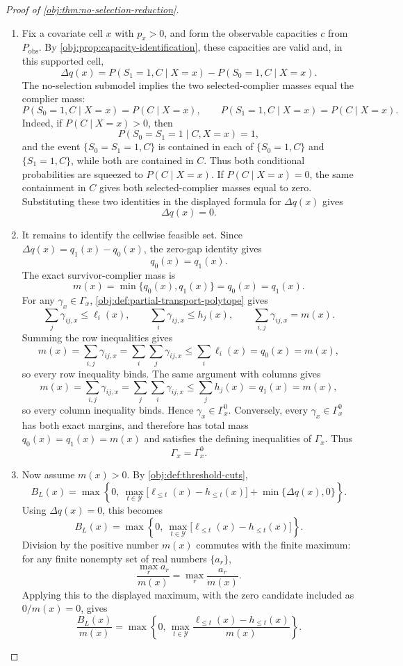 \begin{proof}[Proof of \cref{obj:thm:no-selection-reduction}]
\begin{enumerate}
\item
Fix a covariate cell \(x\) with \(p_x>0\), and form the observable capacities \(c\) from \(P_{\mathrm{obs}}\).  By \cref{obj:prop:capacity-identification}, these capacities are valid and, in this supported cell,
\[
\Delta q(x)
=
P(S_1=1,C\mid X=x)-P(S_0=1,C\mid X=x).
\]
The no-selection submodel implies the two selected-complier masses equal the complier mass:
\[
P(S_0=1,C\mid X=x)=P(C\mid X=x),
\qquad
P(S_1=1,C\mid X=x)=P(C\mid X=x).
\]
Indeed, if \(P(C\mid X=x)>0\), then
\[
P(S_0=S_1=1\mid C,X=x)=1,
\]
and the event \(\{S_0=S_1=1,C\}\) is contained in each of
\(\{S_0=1,C\}\) and \(\{S_1=1,C\}\), while both are contained in \(C\).
Thus both conditional probabilities are squeezed to \(P(C\mid X=x)\).
If \(P(C\mid X=x)=0\), the same containment in \(C\) gives both selected-complier masses equal to zero.  Substituting these two identities in the displayed formula for \(\Delta q(x)\) gives
\[
\Delta q(x)=0 .
\]

\item
It remains to identify the cellwise feasible set.  Since \(\Delta q(x)=q_1(x)-q_0(x)\), the zero-gap identity gives
\[
q_0(x)=q_1(x).
\]
The exact survivor-complier mass is
\[
m(x)=\min\{q_0(x),q_1(x)\}=q_0(x)=q_1(x).
\]
For any \(\gamma_x\in\Gamma_x\), \cref{obj:def:partial-transport-polytope} gives
\[
\sum_j\gamma_{ij,x}\le \ell_i(x),
\qquad
\sum_i\gamma_{ij,x}\le h_j(x),
\qquad
\sum_{i,j}\gamma_{ij,x}=m(x).
\]
Summing the row inequalities gives
\[
m(x)=\sum_{i,j}\gamma_{ij,x}
=\sum_i\sum_j\gamma_{ij,x}
\le \sum_i \ell_i(x)=q_0(x)=m(x),
\]
so every row inequality binds.  The same argument with columns gives
\[
m(x)=\sum_{i,j}\gamma_{ij,x}
=\sum_j\sum_i\gamma_{ij,x}
\le \sum_j h_j(x)=q_1(x)=m(x),
\]
so every column inequality binds.  Hence \(\gamma_x\in\Gamma_x^{0}\).  Conversely, every \(\gamma_x\in\Gamma_x^{0}\) has both exact margins, and therefore has total mass \(q_0(x)=q_1(x)=m(x)\) and satisfies the defining inequalities of \(\Gamma_x\).  Thus
\[
\Gamma_x=\Gamma_x^{0}.
\]

\item
Now assume \(m(x)>0\).  By \cref{obj:def:threshold-cuts},
\[
B_L(x)
=
\max\left\{
0,\
\max_{t\in\mathcal Y}\bigl[\ell_{\le t}(x)-h_{\le t}(x)\bigr]
+\min\{\Delta q(x),0\}
\right\}.
\]
Using \(\Delta q(x)=0\), this becomes
\[
B_L(x)
=
\max\left\{
0,\
\max_{t\in\mathcal Y}\bigl[\ell_{\le t}(x)-h_{\le t}(x)\bigr]
\right\}.
\]
Division by the positive number \(m(x)\) commutes with the finite maximum: for any finite nonempty set of real numbers \(\{a_r\}\),
\[
\frac{\max_r a_r}{m(x)}
=
\max_r \frac{a_r}{m(x)}.
\]
Applying this to the displayed maximum, with the zero candidate included as \(0/m(x)=0\), gives
\[
\frac{B_L(x)}{m(x)}
=
\max\left\{
0,\,
\max_{t\in\mathcal Y}
\frac{\ell_{\le t}(x)-h_{\le t}(x)}{m(x)}
\right\}.
\]


\end{enumerate}
\end{proof}
